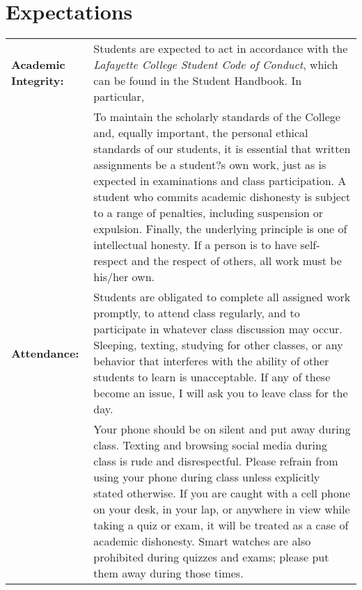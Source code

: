 \documentclass[10pt]{amsart}
\begin{document}
\section*{Expectations}
\noindent
\begin{tabular}{p{1.4in}p{5in}}
  {\bf Academic Integrity:} & Students are expected to act in accordance with the {\it Lafayette College Student Code of Conduct}, 
  which can be found in the Student Handbook.  In particular,\\
  & To maintain the scholarly standards of the College and, equally important, the personal ethical standards of our students, it is essential that written assignments be a student?s own work, just as is expected in examinations and class participation. A student who commits academic dishonesty is subject to a range of penalties, including suspension or expulsion. Finally, the underlying principle is one of intellectual honesty. If a person is to have self-respect and the respect of others, all work must be his/her own.\\
 
  {\bf Attendance:} & Students are obligated to complete all assigned work promptly, to attend class regularly, and to participate in whatever class discussion may occur.  Sleeping, texting, studying for other classes, or any behavior that interferes with the ability of other students to learn is unacceptable.  If any of these become an issue, I will ask you to leave class for the day.\\
  & Your phone should be on silent and put away during class.  Texting and browsing social media during class is rude and disrespectful.  Please refrain from using your phone during class unless explicitly stated otherwise.  If you are caught with a cell phone on your desk, in your lap, or anywhere in view while taking a quiz or exam, it will be treated as a case of academic dishonesty.  Smart watches are also prohibited during quizzes and exams; please put them away during those times. \\
   \end{tabular}
\end{document}
